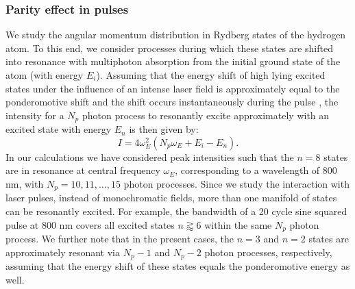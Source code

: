 \subsubsection{Parity effect in pulses}
\label{ssub:parity}
We study the angular momentum distribution in Rydberg states of the hydrogen atom. To this end, we consider processes during which these states are shifted into resonance with multiphoton absorption from the initial ground state of the atom (with energy $E_i$). Assuming that the energy shift of high lying excited states under the influence of an intense laser field is approximately equal to the ponderomotive shift \cite{agostini1989} and the shift occurs instantaneously during the pulse \cite{he2011}, the intensity for a $N_p$ photon process to resonantly excite  approximately with an excited state with energy $E_n$ is then given by:
%
\begin{equation}
I = 4\omega_E^2(N_p\omega_E + E_i - E_n).
\end{equation}
%
In our calculations we have considered peak intensities such that the $n=8$ states are in resonance at central frequency $\omega_E$, corresponding to a wavelength of 800 nm, with $N_p = 10, 11, \ldots, 15$ photon processes. Since we study the interaction with laser pulses, instead of monochromatic fields, more than one manifold of states can be resonantly excited. For example, the bandwidth of a 20 cycle sine squared pulse at 800 nm covers all excited states $n \gtrapprox 6$ within the same $N_p$ photon process. We further note that in the present cases, the $n=3$ and $n=2$ states are approximately resonant via $N_p-1$ and $N_p-2$ photon processes, respectively, assuming that the energy shift of these states equals the ponderomotive energy as well.

